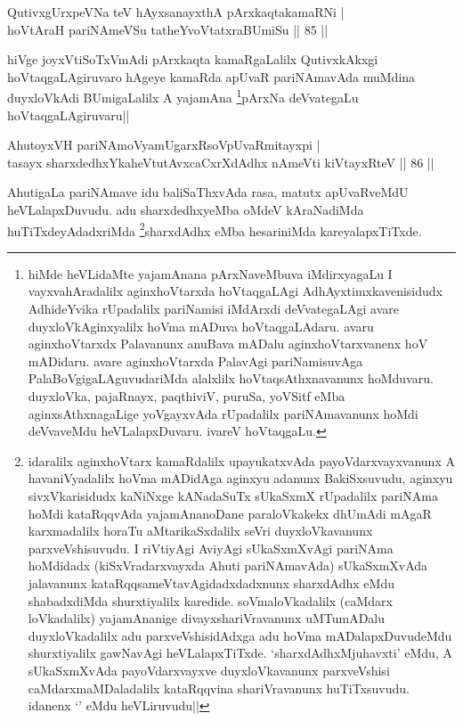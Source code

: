 \begin{shl}
QutivxgUrxpeVNa teV hAyxsanayxthA pArxkaqtakamaRNi | \\
hoVtAraH pariNAmeVSu tatheYvoVtatxraBUmiSu \hfill|| 85 || 
\end{shl}

\begin{artha}
hiVge joyxVtiSoTxVmAdi pArxkaqta kamaRgaLalilx QutivxkAkxgi 
hoVtaqgaLAgiruvaro hAgeye kamaRda apUvaR pariNAmavAda muMdina 
duyxloVkAdi BUmigaLalilx A yajamAna \footnote[1]{hiMde heVLidaMte 
yajamAnana pArxNaveMbuva iMdirxyagaLu I vayxvahAradalilx 
aginxhoVtarxda hoVtaqgaLAgi AdhAyxtimxkavenisidudx AdhideYvika 
rUpadalilx pariNamisi iMdArxdi deVvategaLAgi avare duyxloVkAginxyalilx 
hoVma mADuva hoVtaqgaLAdaru. avaru aginxhoVtarxdx Palavanunx anuBava 
mADalu aginxhoVtarxvanenx hoV mADidaru. avare aginxhoVtarxda PalavAgi 
pariNamisuvAga PalaBoVgigaLAguvudariMda alalxlilx hoVtaqsAthxnavanunx 
hoMduvaru. duyxloVka, pajaRnayx, paqthiviV, puruSa, yoVSitf eMba 
aginxsAthxnagaLige yoVgayxvAda rUpadalilx pariNAmavanunx hoMdi 
deVvaveMdu heVLalapxDuvaru. ivareV hoVtaqgaLu.}pArxNa deVvategaLu 
hoVtaqgaLAgiruvaru||
\end{artha}


\begin{shl}
AhutoyxVH pariNAmoV\s yamUgarxRsoV\s pUvaRmitayxpi | \\
tasayx sharxdedhxYkaheVtutAvxcaCxrXdAdhx nAmeVti kiVtayxRteV \hfill|| 86 || 
\end{shl}

\begin{artha}
AhutigaLa pariNAmave idu baliSaThxvAda rasa, matutx apUvaRveMdU 
heVLalapxDuvudu. adu sharxdedhxyeMba oMdeV kAraNadiMda 
huTiTxdeyAdadxriMda \footnote[2]{idaralilx aginxhoVtarx kamaRdalilx 
upayukatxvAda payoVdarxvayxvanunx A havaniVyadalilx hoVma mADidAga 
aginxyu adanunx BakiSxsuvudu, aginxyu sivxVkarisidudx kaNiNxge 
kANadaSuTx sUkaSxmX rUpadalilx pariNAma hoMdi kataRqqvAda 
yajamAnanoDane paraloVkakekx dhUmAdi mAgaR karxmadalilx horaTu 
aMtarikaSxdalilx seVri duyxloVkavanunx parxveVshisuvudu. I riVtiyAgi 
AviyAgi sUkaSxmXvAgi pariNAma hoMdidadx (kiSxVradarxvayxda Ahuti 
pariNAmavAda) sUkaSxmXvAda jalavanunx kataRqqsameVtavAgidadxdadxnunx 
sharxdAdhx eMdu shabadxdiMda shurxtiyalilx karedide. soVmaloVkadalilx 
(caMdarx loVkadalilx) yajamAnanige divayxshariVravanunx uMTumADalu 
duyxloVkadalilx adu parxveVshisidAdxga adu hoVma mADalapxDuvudeMdu 
shurxtiyalilx gawNavAgi heVLalapxTiTxde. `sharxdAdhxMjuhavxti' eMdu, A 
sUkaSxmXvAda payoVdarxvayxve duyxloVkavanunx parxveVshisi 
caMdarxmaMDaladalilx kataRqqvina shariVravanunx huTiTxsuvudu. idanenx 
`\stext' eMdu heVLiruvudu||}sharxdAdhx eMba hesariniMda 
kareyalapxTiTxde.
\end{artha}

